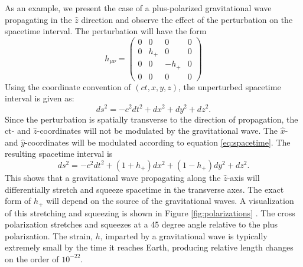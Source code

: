 As an example, we present the case of a plus-polarized gravitational wave 
propagating in the $\hat{z}$ direction and observe the effect of the perturbation 
on the spacetime interval. The perturbation will have the form 
\begin{equation}
h_{\mu\nu} = 
  \begin{pmatrix}
    0 & 0 & 0 & 0 \\
    0 & h_+ & 0 & 0 \\
    0 & 0 & -h_+ & 0 \\
    0 & 0 & 0 & 0
  \end{pmatrix}
\end{equation}
Using the coordinate convention of $(ct,x,y,z)$, the unperturbed
spacetime interval is given as: 
\begin{equation}
ds^2 = -c^2 dt^2 + dx^2 + dy^2 + dz^2.
\end{equation}
Since the perturbation is spatially transverse to the direction of 
propagation, the ct- and $\hat{z}$-coordinates will not be modulated by the 
gravitational wave. The $\hat{x}$- and $\hat{y}$-coordinates will be modulated  
according to equation \ref{eq:spacetime}. The resulting spacetime 
interval is
\begin{equation}
ds^2 = -c^2 dt^2 + (1 + h_+)dx^2 + (1 - h_+)dy^2 + dz^2.
\end{equation}
This shows that a gravitational wave propagating along the $\hat{z}$-axis 
will differentially stretch and squeeze spacetime in the transverse 
axes. The exact form of $h_+$ will depend on the source of the 
gravitational waves. A visualization of this stretching and squeezing 
is shown in Figure \ref{fig:polarizations} \cite{Polarization}. The cross polarization  
stretches and squeezes at a 45 degree angle relative to the plus 
polarization. The strain, $h$, imparted by a gravitational wave is 
typically extremely small by the time it reaches Earth, producing 
relative length changes on the order of $10^{-22}$. 

